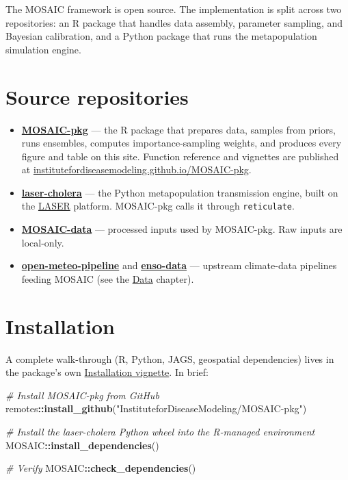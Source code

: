 \documentclass[
]{book}
\newenvironment{Shaded}{\begin{snugshade}}{\end{snugshade}}
\newcommand{\CommentTok}[1]{\textcolor[rgb]{0.56,0.35,0.01}{\textit{#1}}}
\newcommand{\FunctionTok}[1]{\textcolor[rgb]{0.13,0.29,0.53}{\textbf{#1}}}
\newcommand{\NormalTok}[1]{#1}
\newcommand{\SpecialCharTok}[1]{\textcolor[rgb]{0.81,0.36,0.00}{\textbf{#1}}}
\newcommand{\StringTok}[1]{\textcolor[rgb]{0.31,0.60,0.02}{#1}}
\providecommand{\tightlist}{%
  \setlength{\itemsep}{0pt}\setlength{\parskip}{0pt}}
\begin{document}
The MOSAIC framework is open source. The implementation is split across two repositories: an R package that handles data assembly, parameter sampling, and Bayesian calibration, and a Python package that runs the metapopulation simulation engine.

\section{Source repositories}\label{source-repositories}

\begin{itemize}
\tightlist
\item
  \textbf{\href{https://github.com/InstituteforDiseaseModeling/MOSAIC-pkg}{MOSAIC-pkg}} --- the R package that prepares data, samples from priors, runs ensembles, computes importance-sampling weights, and produces every figure and table on this site. Function reference and vignettes are published at \href{https://institutefordiseasemodeling.github.io/MOSAIC-pkg/}{institutefordiseasemodeling.github.io/MOSAIC-pkg}.
\item
  \textbf{\href{https://github.com/InstituteforDiseaseModeling/laser-cholera}{laser-cholera}} --- the Python metapopulation transmission engine, built on the \href{https://github.com/InstituteforDiseaseModeling/laser}{LASER} platform. MOSAIC-pkg calls it through \texttt{reticulate}.
\item
  \textbf{\href{https://github.com/InstituteforDiseaseModeling/MOSAIC-data}{MOSAIC-data}} --- processed inputs used by MOSAIC-pkg. Raw inputs are local-only.
\item
  \textbf{\href{https://github.com/InstituteforDiseaseModeling/open-meteo-pipeline}{open-meteo-pipeline}} and \textbf{\href{https://github.com/InstituteforDiseaseModeling/enso-data}{enso-data}} --- upstream climate-data pipelines feeding MOSAIC (see the \hyperref[data]{Data} chapter).
\end{itemize}

\section{Installation}\label{installation}

A complete walk-through (R, Python, JAGS, geospatial dependencies) lives in the package's own \href{https://institutefordiseasemodeling.github.io/MOSAIC-pkg/articles/Installation.html}{Installation vignette}. In brief:

\begin{Shaded}
\begin{Highlighting}[]
\CommentTok{\# Install MOSAIC{-}pkg from GitHub}
\NormalTok{remotes}\SpecialCharTok{::}\FunctionTok{install\_github}\NormalTok{(}\StringTok{"InstituteforDiseaseModeling/MOSAIC{-}pkg"}\NormalTok{)}

\CommentTok{\# Install the laser{-}cholera Python wheel into the R{-}managed environment}
\NormalTok{MOSAIC}\SpecialCharTok{::}\FunctionTok{install\_dependencies}\NormalTok{()}

\CommentTok{\# Verify}
\NormalTok{MOSAIC}\SpecialCharTok{::}\FunctionTok{check\_dependencies}\NormalTok{()}
\end{Highlighting}
\end{Shaded}
\end{document}
